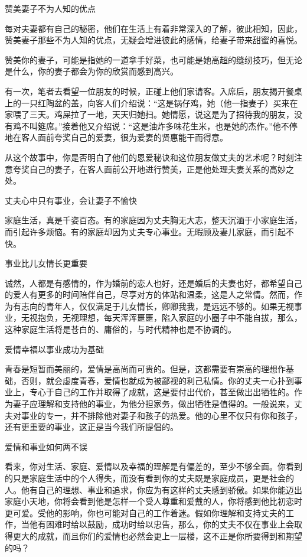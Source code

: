 \documentclass[12pt,UTF8,openany]{ctexbook}
\begin{document}
赞美妻子不为人知的优点


每对夫妻都有自己的秘密，他们在生活上有着非常深入的了解，彼此相知，因此，赞美妻子那些不为人知的优点，无疑会增进彼此的感情，给妻子带来甜蜜的喜悦。

赞美你的妻子，可能是指她的一道拿手好菜，也可能是她高超的缝纫技巧，但无论是什么，你的妻子都会为你的欣赏而感到高兴。

有一次，笔者去看望一位朋友的时候，正碰上他们家请客。入席后，朋友揭开餐桌上的一只红陶盆的盖，向客人们介绍说：“这是锅仔鸡，她（他一指妻子）买来在家喂了三天。鸡屎拉了一地，天天归她扫。她情愿，说这是为了招待我的朋友，没有鸡不叫筵席。”接着他又介绍说：“这是油炸多味花生米，也是她的杰作。”他不停地在客人面前夸奖自己的爱妻，很为爱妻的贤惠能干而得意。

从这个故事中，你是否明白了他们的恩爱秘诀和这位朋友做丈夫的艺术呢？时刻注意夸奖自己的妻子，在客人面前公开地进行赞美，正是他处理夫妻关系的高妙之处。





丈夫心中只有事业，会让妻子不愉快


家庭生活，真是千姿百态。有的家庭因为丈夫胸无大志，整天沉湎于小家庭生活，而引起许多烦恼。有的家庭却因为丈夫专心事业。无暇顾及妻儿家庭，而引起不快。





事业比儿女情长更重要


诚然，人都是有感情的，作为婚前的恋人也好，还是婚后的夫妻也好，都希望自己的爱人有更多的时间陪伴自己，尽享对方的体贴和温柔，这是人之常情。然而，作为有志向的青年人，仅仅满足于儿女情长，卿卿我我，是远远不够的。如果无视事业，无视抱负，无视理想，每天浑浑噩噩，陷入家庭的小圈子中不能自拔，那么，这种家庭生活将是苍白的、庸俗的，与时代精神也是不协调的。





爱情幸福以事业成功为基础


青春是短暂而美丽的，爱情是高尚而可贵的。但是，这都需要有崇高的理想作基础，否则，就会虚度青春，爱情也就成为被鄙视的利己私情。你的丈夫一心扑到事业上，专心于自己的工作并取得了成就，这是要付出代价，甚至做出出牺牲的。作为妻子应理解和支持他的事业，为他分担家务，做出牺牲是值得的。一般说来，丈夫对事业的专一，并不排除他对妻子和孩子的热爱。他的心里不仅只有你和孩子，还有更重要的事业，这正是当今我们所提倡的。





爱情和事业如何两不误


看来，你对生活、家庭、爱情以及幸福的理解是有偏差的，至少不够全面。你看到的只是家庭生活中的个人得失，而没有看到你的丈夫既是家庭成员，更是社会的人。他有自己的理想、事业和追求，你应为有这样的丈夫感到骄傲。如果你能迈出家庭小天地，你将会看到他是怎样一个受人尊重和爱戴的人，你将感到他比初恋时更可爱。受他的影响，你也可能对自己的工作着迷。假如你理解和支持丈夫的工作，当他有困难时给以鼓励，成功时给以忠告，那么，你的丈夫不仅在事业上会取得更大的成就，而且你们的爱情也必然会更上一层楼，这不正是你所要得到和期望的吗？
\end{document}
